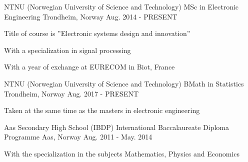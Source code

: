 \begin{cventries}
  \cventry
    {NTNU (Norwegian University of Science and Technology)}
    {MSc in Electronic Engineering}
    {Trondheim, Norway}
    {Aug. 2014 - PRESENT}
    {
      \begin{cvitems}
        \item {Title of course is ''Electronic systems design and innovation''}
        \item {With a specialization in signal processing}
        \item {With a year of exchange at EURECOM in Biot, France}
      \end{cvitems}
    }
  \cventry
    {NTNU (Norwegian University of Science and Technology)}
    {BMath in Statistics}
    {Trondheim, Norway}
    {Aug. 2017 - PRESENT}
    {
      \begin{cvitems}
        \item {Taken at the same time as the masters in electronic engineering}
      \end{cvitems}
    }
  \cventry
    {Aas Secondary High School}
    {(IBDP) International Baccalaureate Diploma Programme}
    {Aas, Norway}
    {Aug. 2011 - May. 2014}
    {
      \begin{cvitems}
        \item {With the specialization in the subjects Mathematics, Physics and Economics}
      \end{cvitems}
    }
\end{cventries}
